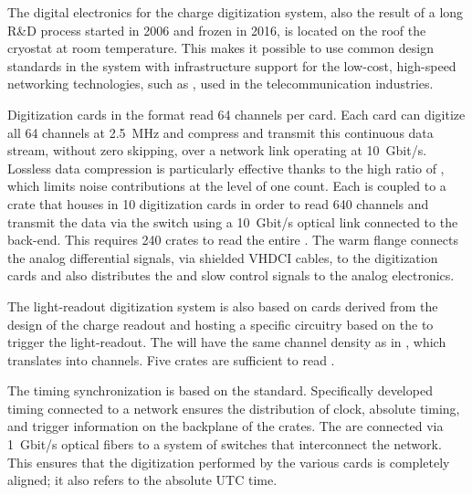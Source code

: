 The digital electronics for the charge digitization system, also the result of a long R\&D process started in 2006 and frozen in 2016, is located 
on the roof the cryostat at room temperature. %
This makes it possible to use common design standards in the system with infrastructure support for the low-cost, high-speed networking technologies, such as , used in the telecommunication industries.

Digitization cards in the  format read \num{64} channels per card. Each  card can digitize all  \num{64} channels at \SI{2.5}{MHz} and compress and transmit this continuous data stream, without zero skipping, over a network link operating at \SI{10}{Gbit/s}. Lossless data compression is particularly effective thanks to the high  ratio  of , which limits noise contributions at the level of one  count. Each  is coupled to a  crate that houses in \num{10}  digitization cards in order to read  \num{640} channels and transmit the data via the  switch using a \SI{10}{Gbit/s} optical link connected to the  back-end. This requires \num{240}  crates to read the entire . The  warm flange connects the analog differential signals, via shielded VHDCI cables, to the  digitization cards and also distributes the  and slow control signals to the analog  electronics.  

The light-readout digitization system is also based on   cards derived from the design of the charge readout and hosting a specific circuitry based on the   to trigger the light-readout. The   will have the same  channel density as in , which translates into \dpnumpmtch channels. Five  crates are sufficient to read \dpnumpmtch {}.

The timing synchronization is based on the  standard. Specifically developed timing  connected to a  network ensures the distribution of clock, absolute timing, and trigger information on the backplane of the  crates. The  are connected via \SI{1}{Gbit/s} optical fibers to a system of  switches that interconnect the  network. This ensures that the digitization performed by the various  cards is completely aligned; it also refers to the absolute UTC time. 

